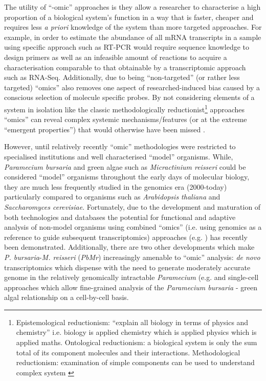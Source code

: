 The utility of ``-omic'' approaches is they allow a researcher to characterise a high proportion 
of a biological system's function in a way that is faster, cheaper and requires less \textit{a priori} 
knowledge of the system than more targeted approaches.
For example, in order to estimate the abundance of all mRNA transcripts in a sample using specific
approach such as RT-PCR would require sequence knowledge to design primers as well as an infeasible amount of
reactions to acquire a characterisation comparable to that obtainable by a transcriptomic approach such as RNA-Seq. 
Additionally, due to being ``non-targeted'' (or rather less targeted) ``omics'' also removes one aspect of 
researched-induced bias caused by a conscious selection of molecule specific probes.
By not considering elements of a system in isolation like the classic methodologically reductionist\footnote{
    Epistemological reductionism: ``explain all biology in terms of physics and chemistry'' \citep{Crick1966}
    i.e. biology is applied chemistry which is applied physics which is applied maths. 
    Ontological reductionism: a biological system is only the sum total of its component molecules and their
    interactions.
    Methodological reductionism: examination of simple components can be used to understand complex system \citep{Fang2011}}
approaches ``omics'' can reveal complex systemic mechanisms/features (or at the extreme ``emergent properties'') that would
otherwise have been missed \citep{Fang2011}.  


However, until relatively recently ``omic'' methodologies were restricted to specialised 
institutions and well characterised ``model'' organisms.  
While, \textit{Paramecium bursaria} and green algae such as \textit{Micractinium
reisseri} could be considered ``model'' organisms throughout the early days of 
molecular biology, they are much less frequently studied in the genomics
era (2000-today) particularly compared to organisms such as \textit{Arabidopsis thaliana} and \textit{Saccharomyces
cerevisiae}. Fortunately, due to the development and maturation of both technologies and databases 
the potential for functional and adaptive analysis of non-model organisms using 
combined ``omics'' (i.e. using genomics as a reference to guide subsequent transcriptomics) approaches 
(e.g. \citep{Munoz-Merida2013,Feldmesser2014}) has recently been demonstrated.  
Additionally, there are two other developments which make \textit{P. bursaria}-\textit{M. reisseri} (\textit{PbMr}) 
increasingly amenable to
``omic'' analysis: \textit{de novo} transcriptomics which dispense with the need to generate
moderately accurate genome in the relatively genomically intractable \textit{Paramecium} (e.g. \citep{Kodama2014}  and
single-cell approaches which allow fine-grained analysis of the \textit{Paramecium bursaria}
- green algal relationship on a cell-by-cell basis.


